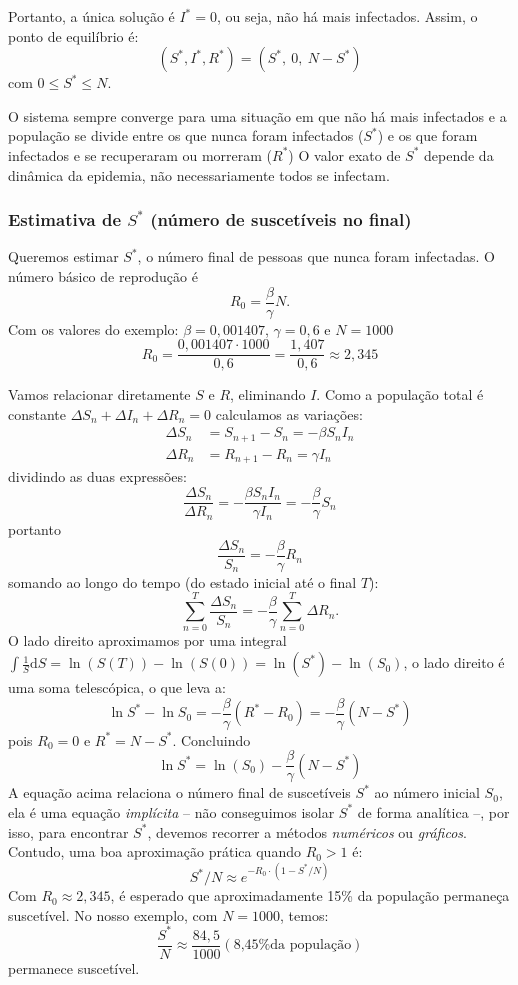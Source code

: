 \documentclass{article}
\begin{document}
Portanto, a única solução é $I^* = 0$, ou seja, não há mais infectados.
Assim, o ponto de equilíbrio é:
\[
\boxed{ (S^*, I^*, R^*) = (S^*,\ 0,\ N - S^*) }
\]
com $0 \leq S^* \leq N$.

O sistema sempre converge para uma situação em que não há mais
infectados e a população se divide entre os que nunca foram infectados
($S^*$) e os que foram infectados e se recuperaram ou morreram ($R^*$)
O valor exato de $S^*$ depende da dinâmica da epidemia, não
necessariamente todos se infectam.

\subsubsection{Estimativa de $S^*$ (número de suscetíveis no final)}

Queremos estimar $S^*$, o número final de pessoas que nunca foram
infectadas. O número básico de reprodução é
\[
R_0 = \frac{\beta }{\gamma} N.
\]
Com os valores do exemplo: \(\beta = 0{,}001407\), \(\gamma = 0{,}6\) e \(N = 1000\)
\[
R_0 = \frac{0{,}001407 \cdot 1000}{0,6} = \frac{1{,}407}{0{,}6} \approx 2{,}345
\]

Vamos relacionar diretamente \( S \) e \( R \), eliminando \( I
\). Como a população total é constante
\( \Delta S_n + \Delta I_n + \Delta R_n = 0 \) calculamos as variações:
\[
  \begin{aligned}
    \Delta S_n &= S_{n+1} - S_n = -\beta S_n I_n\\
    \Delta R_n &= R_{n+1} - R_n = \gamma I_n
\end{aligned}
\]
dividindo as duas expressões:
\[
  \frac{\Delta S_n}{\Delta R_n} = -\frac{\beta S_n I_n}{\gamma I_n} =
  -\frac{\beta}{\gamma} S_n
\]
portanto
\[
  \frac{\Delta S_n}{S_n} = 
  -\frac{\beta}{\gamma}  R_n
\]
somando ao longo do tempo (do estado inicial até o final $T$):
\[
  \sum_{n=0}^{T} \frac{\Delta S_n}{S_n} = -\frac{\beta}{\gamma} \sum_{n=0}^{T}
  \Delta R_n.
\]
O lado direito aproximamos por uma integral
$\int \tfrac 1S \mathrm{d}S = \ln(S(T)) -\ln(S(0)) =
\ln(S^*)-\ln(S_0)$, o lado direito é uma soma telescópica, o que leva
a:
\[
\ln S^* - \ln S_0 = -\frac{\beta}{\gamma}  (R^* - R_0) = -\frac{\beta}{\gamma} (N - S^*)
\]
pois \( R_0 = 0 \) e \( R^* = N - S^* \). Concluindo
\[
\boxed{  
\ln {S^*} =\ln(S_0) -\frac{\beta}{\gamma}  (N - S^*)  
}
\]
A equação acima relaciona o número final de suscetíveis \( S^* \) ao
número inicial \( S_0 \), ela é uma equação \emph{implícita} -- não
conseguimos isolar \( S^* \) de forma analítica --, por isso, para
encontrar \( S^* \), devemos recorrer a métodos \emph{numéricos} ou
\emph{gráficos}.  Contudo, uma boa aproximação prática quando $R_0 > 1$
é:
\[
  S^*/N \approx e^{-R_0 \cdot (1 - S^*/N)}
\]
Com $R_0 \approx 2,345$, é esperado que aproximadamente 15\%  da
população permaneça suscetível. No nosso exemplo, com $N = 1000$, temos:
\[
\frac{S^*}N \approx \frac{84,5}{1000} (\text{8,45\% da população})
\]
permanece suscetível.
\end{document}
